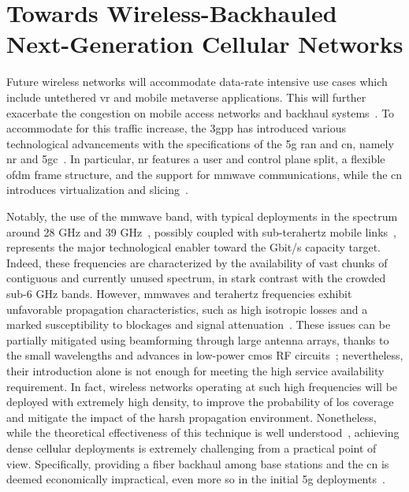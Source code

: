 \chapter{Towards Wireless-Backhauled Next-Generation Cellular Networks}
\label{ch:iab}


Future wireless networks will accommodate data-rate intensive use cases which include untethered \gls{vr} and mobile metaverse applications. This will further exacerbate the congestion on mobile access networks and backhaul systems~\cite{holo1}.
To accommodate for this traffic increase, the \gls{3gpp} has introduced various technological advancements with the specifications of the \gls{5g} \gls{ran} and \gls{cn}, namely \gls{nr} and \gls{5gc}~\cite{3gpp_38_300}. In particular, \gls{nr} features a user and control plane split, a flexible \gls{ofdm} frame structure, and the support for \gls{mmwave} communications, while the \gls{cn} introduces virtualization and slicing~\cite{yousaf2017nfv}. 

Notably, the use of the \gls{mmwave} band, with typical deployments in the spectrum around 28 GHz and 39 GHz~\cite{shafi2017deployment}, possibly coupled with sub-terahertz mobile links~\cite{polese2020toward, 8869705}, represents the major technological enabler toward the Gbit/s capacity target. Indeed, these frequencies are characterized by the availability of vast chunks of contiguous and currently unused spectrum, in stark contrast with the crowded sub-6 GHz bands. 
However, \glspl{mmwave} and terahertz frequencies exhibit unfavorable propagation characteristics, such as high isotropic losses and a marked susceptibility to blockages and signal attenuation~\cite{khan2011mmwave, rangan2014millimeter}.
These issues can be partially mitigated using beamforming through large antenna arrays, thanks to the small wavelengths and advances in low-power \gls{cmos} RF circuits~\cite{hemadeh2017millimeter}; nevertheless, their introduction alone is not enough for meeting the high service availability requirement. 
In fact, wireless networks operating at such high frequencies will be deployed with extremely high density, to improve the probability of \gls{los} coverage and mitigate the impact of the harsh propagation environment. 
Nonetheless, while the theoretical effectiveness of this technique is well understood~\cite{gomez2017capacity}, achieving dense cellular deployments is extremely challenging from a practical point of view. Specifically, providing a fiber backhaul among base stations and the \gls{cn} is deemed economically impractical, even more so in the initial \gls{5g} deployments~\cite{polese2020integrated}.

